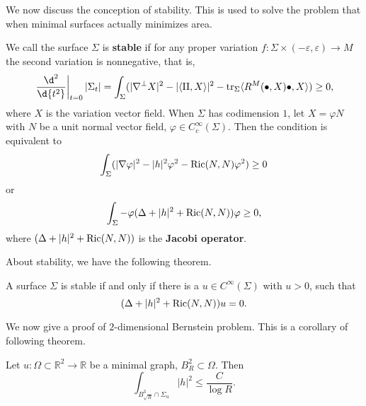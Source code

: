 We now discuss the conception of stability.
This is used to solve the problem that when minimal surfaces actually minimizes area.
\begin{defn}[Stability]
    We call the surface $\Sigma$ is \textbf{stable} if for any proper variation $f:\Sigma\times(-\varepsilon,\varepsilon)\to M$ the second variation is nonnegative, that is,
    \[\left.\frac{\d^2{}}{\d{t^2}}\right|_{t=0}|\Sigma_t|=\int_\Sigma(|\nabla^\perp X|^2-|\langle\II,X\rangle|^2-\tr_\Sigma\langle R^M(\bullet,X)\bullet,X\rangle)\geq 0,\]
    where $X$ is the variation vector field.
    When $\Sigma$ has codimension $1$, let $X=\varphi N$ with $N$ be a unit normal vector field, $\varphi\in C^\infty_c(\Sigma)$.
    Then the condition is equivalent to
    \[\int_\Sigma(|\nabla\varphi|^2-|h|^2\varphi^2-\operatorname{Ric}(N,N)\varphi^2)\geq 0\]
    or
    \[\int_\Sigma-\varphi(\Delta+|h|^2+\operatorname{Ric}(N,N))\varphi\geq 0,\]
    where $(\Delta+|h|^2+\operatorname{Ric}(N,N))$ is the \textbf{Jacobi operator}.
\end{defn}

About stability, we have the following theorem.
\begin{thm}
    A surface $\Sigma$ is stable if and only if there is a $u\in C^\infty(\Sigma)$ with $u>0$, such that
    \[(\Delta+|h|^2+\operatorname{Ric}(N,N))u=0.\]
\end{thm}

We now give a proof of $2$-dimensional Bernstein problem.
This is a corollary of following theorem.
\begin{thm}\label{prebernstein}
    Let $u:\Omega\subset\mathbb{R}^2\to\mathbb{R}$ be a minimal graph, $B^2_R\subset\Omega$.
    Then
    \[\int_{B^3_{\sqrt{R}}\cap\Sigma_u}|h|^2\leq\frac{C}{\log{R}}.\]
\end{thm}

